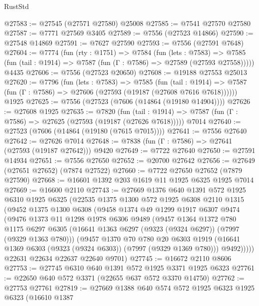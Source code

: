 \begin{lexlean}{RustStd}
\begin{coremodule}
{\begin{coremodule}
{{{{{{{{{{{{{{{{{{{{{{{{{{{{{{{{{{{{{{{{{{{@27583 := @27545 (@27571 @27580) @25008
@27585 := @7541 @27570 @27580
@27587 := @7771 @27569 @3405
@27589 := @7556 (@27523 @14866)
@27590 := @27548 @14869
@27591 := @7627 @27590
@27593 := @7556 (@27591 @7648)
@27604 := @7774
    (fun (rty : @1751) =>
    @7584
      (fun (lets : @7583) =>
      @7585 (fun (tail : @1914) => @7587 (fun (Γ : @7586) => @27589 (@27593 @27558)))))
    @4435
@27606 := @7556 (@27523 @20650)
@27608 := @19188 @27553 @25013
@27620 := @7796
    (fun (lets : @7583) =>
    @7585
      (fun (tail : @1914) =>
      @7587 (fun (Γ : @7586) => @27606 (@27593 (@19187 (@27608 @7616 @7618))))))
    @1925
@27625 := @7556 (@27523 (@7606 (@14864 (@19180 @14904))))
@27626 := @27608 @1925
@27635 := @7820
    (fun (tail : @1914) => @7587 (fun (Γ : @7586) => @27625 (@27593 (@19187 (@27626 @7618)))))
    @7014
@27640 := @27523 (@7606 (@14864 (@19180 (@7615 @7015))))
@27641 := @7556 @27640
@27642 := @27626 @7014
@27648 := @7838 (fun (Γ : @7586) => @27641 (@27593 (@19187 @27642))) @9420
@27649 := @7722 @27640
@27650 := @27591 @14934
@27651 := @7556 @27650
@27652 := @20700 @27642
@27656 := @27649 (@27651 @27652) (@7874 @27522)
@27660 := @7722 @27650 @27652 (@7879 @27590)
@27668 := @16601 @1392 @203 @1619 @11 @1925 @6325 @1925 @7014
@27669 := @16600 @2110
@27743 := @27669
    @1376
    @640
    @1391
    @572
    @1925
    @6310
    @1925
    @6325
    (@22535
      @1375
      @1300
      @572
      @1925
      @6308
      @2110
      @1315
      (@9452
        @1375
        @1300
        @6308
        (@9458
          @1374
          @49
          @1299
          @1917
          @6307
          @9474
          (@9476
            @1373
            @11
            @1298
            @1978
            @6306
            @9489
            (@9457
              @1364
              @1372
              @780
              @1175
              @6297
              @6305
              (@16641 @1363 @6297 (@9323 (@9324 @6297)) (@7997 (@9329 @1363 @780)))
              (@9457
                @1370
                @70
                @780
                @20
                @6303
                @1919
                (@16641 @1369 @6303 (@9323 (@9324 @6303)) (@7997 (@9329 @1369 @780)))
                @9492)))))
      @22631
      @22634
      @22637
      @22640
      @9701)
@27745 := @16672 @2110 @8606
@27753 := @27745 @6310 @640 @1391 @572 @1925 @3371 @1925 @6323
@27761 := @22650 @640 @572 @3371 (@22655 @637 @572 @3370 @14750)
@27762 := @27753 @27761
@27819 := @27669
    @1388
    @640
    @574
    @572
    @1925
    @6323
    @1925
    @6323
    (@16610
      @1387
}}}}}}}}}}}}}}}}}}}}}}}}}}}}}}}}}}}}}}}}}}}
\end{coremodule}}
\end{coremodule}
\end{lexlean}
